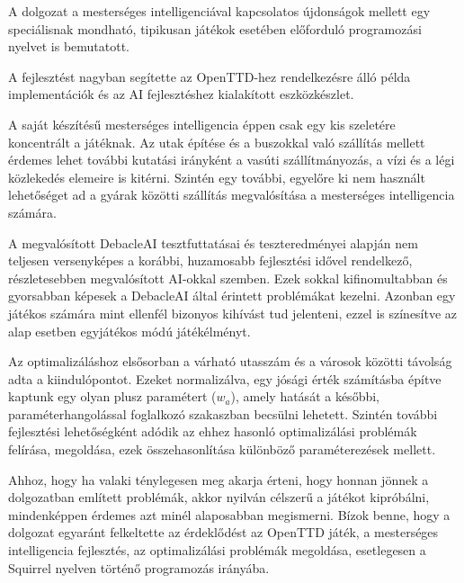 
A dolgozat a mesterséges intelligenciával kapcsolatos újdonságok mellett egy speciálisnak mondható, tipikusan játékok esetében előforduló programozási nyelvet is bemutatott.

A fejlesztést nagyban segítette az OpenTTD-hez rendelkezésre álló példa implementációk és az AI fejlesztéshez kialakított eszközkészlet.

A saját készítésű mesterséges intelligencia éppen csak egy kis szeletére koncentrált a játéknak. Az utak építése és a buszokkal való szállítás mellett érdemes lehet további kutatási irányként a vasúti szállítmányozás, a vízi és a légi közlekedés elemeire is kitérni. Szintén egy további, egyelőre ki nem használt lehetőséget ad a gyárak közötti szállítás megvalósítása a mesterséges intelligencia számára.

A megvalósított DebacleAI tesztfuttatásai és teszteredményei alapján nem teljesen versenyképes a korábbi, huzamosabb fejlesztési idővel rendelkező, részletesebben megvalósított AI-okkal szemben. Ezek sokkal kifinomultabban és gyorsabban képesek a DebacleAI által érintett problémákat kezelni. Azonban egy játékos számára mint ellenfél bizonyos kihívást tud jelenteni, ezzel is színesítve az alap esetben egyjátékos módú játékélményt.

Az optimalizáláshoz elsősorban a várható utasszám és a városok közötti távolság adta a kiindulópontot. Ezeket normalizálva, egy jósági érték számításba építve kaptunk egy olyan plusz paramétert ($w_a$), amely hatását a későbbi, paraméterhangolással foglalkozó szakaszban becsülni lehetett. Szintén további fejlesztési lehetőségként adódik az ehhez hasonló optimalizálási problémák felírása, megoldása, ezek összehasonlítása különböző paraméterezések mellett.

Ahhoz, hogy ha valaki ténylegesen meg akarja érteni, hogy honnan jönnek a dolgozatban említett problémák, akkor nyilván célszerű a játékot kipróbálni, mindenképpen érdemes azt minél alaposabban megismerni.
Bízok benne, hogy a dolgozat egyaránt felkeltette az érdeklődést az OpenTTD játék, a mesterséges intelligencia fejlesztés, az optimalizálási problémák megoldása, esetlegesen a Squirrel nyelven történő programozás irányába.
